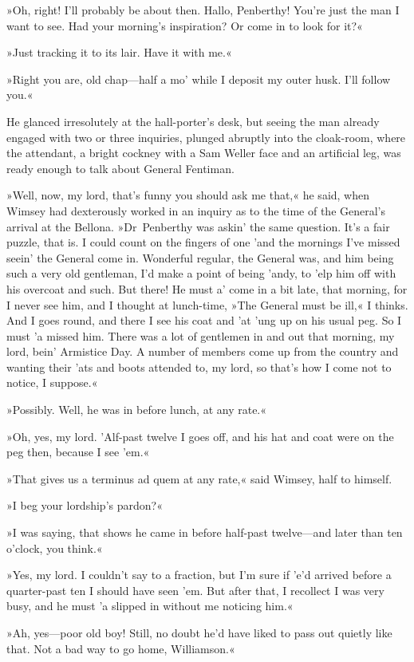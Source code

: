 »Oh, right! I'll probably be about then. Hallo, Penberthy! You're just the man I want to see. Had your morning's inspiration? Or come in to look for it?«

»Just tracking it to its lair. Have it with me.«

»Right you are, old chap—half a mo' while I deposit my outer husk. I'll follow you.«

He glanced irresolutely at the hall-porter's desk, but seeing the man already engaged with two or three inquiries, plunged abruptly into the cloak-room, where the attendant, a bright cockney with a Sam Weller face and an artificial leg, was ready enough to talk about General Fentiman.

»Well, now, my lord, that's funny you should ask me that,« he said, when Wimsey had dexterously worked in an inquiry as to the time of the General's arrival at the Bellona. »Dr~Penberthy was askin' the same question. It's a fair puzzle, that is. I could count on the fingers of one 'and the mornings I've missed seein' the General come in. Wonderful regular, the General was, and him being such a very old gentleman, I'd make a point of being 'andy, to 'elp him off with his overcoat and such. But there! He must a' come in a bit late, that morning, for I never see him, and I thought at lunch-time, »The General must be ill,« I thinks. And I goes round, and there I see his coat and 'at 'ung up on his usual peg. So I must 'a missed him. There was a lot of gentlemen in and out that morning, my lord, bein' Armistice Day. A number of members come up from the country and wanting their 'ats and boots attended to, my lord, so that's how I come not to notice, I suppose.«

»Possibly. Well, he was in before lunch, at any rate.«

»Oh, yes, my lord. 'Alf-past twelve I goes off, and his hat and coat were on the peg then, because I see 'em.«

»That gives us a terminus ad quem at any rate,« said Wimsey, half to himself.

»I beg your lordship's pardon?«

»I was saying, that shows he came in before half-past twelve—and later than ten o'clock, you think.«

»Yes, my lord. I couldn't say to a fraction, but I'm sure if 'e'd arrived before a quarter-past ten I should have seen 'em. But after that, I recollect I was very busy, and he must 'a slipped in without me noticing him.«

»Ah, yes—poor old boy! Still, no doubt he'd have liked to pass out quietly like that. Not a bad way to go home, Williamson.«

